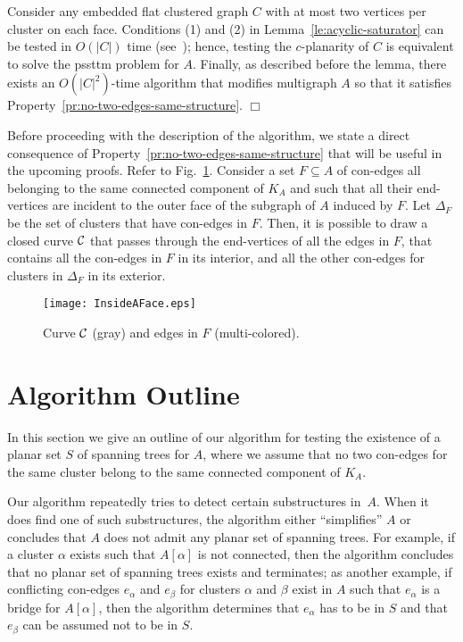 \documentclass[letter,runningheads]{llncs}
\renewenvironment{proof}
{{\em Proof.\ }}{\hspace*{\fill}$\Box$\par\vspace{2mm}}
\begin{document}
\begin{proof}
Consider any embedded flat clustered graph $C$ with at most two vertices per cluster on each face. Conditions (1) and (2) in Lemma~\ref{le:acyclic-saturator} can be tested in $O(|C|)$ time (see~\cite{df-ectefcgsf-09}); hence, testing the $c$-planarity of $C$ is equivalent to solve the {\sc pssttm} problem for $A$. Finally, as described before the lemma, there exists an $O(|C|^2)$-time algorithm that modifies multigraph $A$ so that it satisfies Property~\ref{pr:no-two-edges-same-structure}.
\end{proof}

Before proceeding with the description of the algorithm, we state a direct consequence of Property~\ref{pr:no-two-edges-same-structure} that will be useful in the upcoming proofs. Refer to Fig.~\ref{fig:inside-a-face}. Consider a set $F\subseteq A$ of con-edges all belonging to the same connected component of $K_A$ and such that all their end-vertices are incident to the outer face of the subgraph of $A$ induced by $F$. Let $\Delta_F$ be the set of clusters that have con-edges in $F$. Then, it is possible to draw a closed curve $\cal C$ that passes through the end-vertices of all the edges in $F$, that contains all the con-edges in $F$ in its interior, and all the other con-edges for clusters in $\Delta_F$ in its exterior.

\begin{figure}[htb]
\begin{center}
\mbox{\texttt{[image: InsideAFace.eps]}}
\caption{Curve $\cal C$ (gray) and edges in $F$ (multi-colored).}
\label{fig:inside-a-face}
\end{center}
\end{figure}

\section{Algorithm Outline} \label{se:outline}

In this section we give an outline of our algorithm for testing the existence of a planar set $S$ of spanning trees for $A$, where we assume that no two con-edges for the same cluster belong to the same connected component of $K_A$.

Our algorithm repeatedly tries to detect certain substructures in~$A$. When it does find one of such substructures, the algorithm either ``simplifies'' $A$ or concludes that $A$ does not admit any planar set of spanning trees. For example, if a cluster $\alpha$ exists such that $A[\alpha]$ is not connected, then the algorithm concludes that no planar set of spanning trees exists and terminates; as another example, if conflicting con-edges $e_{\alpha}$ and $e_{\beta}$ for clusters $\alpha$ and $\beta$ exist in $A$ such that $e_{\alpha}$ is a bridge for $A[\alpha]$, then the algorithm determines that $e_{\alpha}$ has to be in $S$ and that $e_{\beta}$ can be assumed not to be in $S$.
\end{document}
